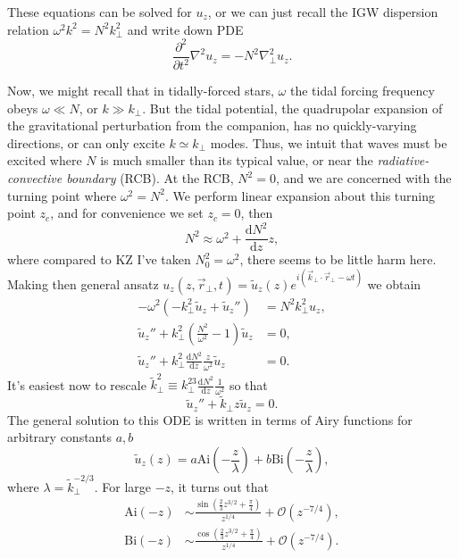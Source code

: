 \documentclass[11pt,
        usenames, %
        dvipsnames %
    ]{article}
\newcommand*{\rd}[2]{\frac{\mathrm{d}#1}{\mathrm{d}#2}}
\newcommand*{\ptd}[2]{\frac{\partial^2 #1}{\partial#2^2}}
\newcommand*{\p}[1]{\left(#1\right)}
\begin{document}
These equations can be solved for $u_z$, or we can just recall the IGW
dispersion relation $\omega^2 k^2 = N^2k_{\perp}^2$ and write down PDE
\begin{equation}
    \ptd{}{t} \nabla^2 u_z = -N^2\nabla_{\perp}^2 u_z.\label{eq:igw_pde}
\end{equation}

Now, we might recall that in tidally-forced stars, $\omega$ the tidal forcing
frequency obeys $\omega \ll N$, or $k \gg k_\perp$. But the tidal potential, the
quadrupolar expansion of the gravitational perturbation from the companion, has
no quickly-varying directions, or can only excite $k \simeq k_\perp$ modes.
Thus, we intuit that waves must be excited where $N$ is much smaller than its
typical value, or near the \emph{radiative-convective boundary} (RCB). At the
RCB, $N^2 = 0$, and we are concerned with the turning point where $\omega^2 =
N^2$. We perform linear expansion about this turning point $z_c$, and for
convenience we set $z_c = 0$, then
\begin{equation}
    N^2 \approx \omega^2 + \rd{N^2}{z}z,
\end{equation}
where compared to KZ I've taken $N_0^2 = \omega^2$, there seems to be little
harm here. Making then general ansatz $u_z(z, \vec{r}_\perp, t) = \tilde{u}_z(z)
e^{i\p{\vec{k}_{\perp} \cdot \vec{r}_{\perp} - \omega t}}$ we obtain
\begin{align}
    -\omega^2 \p{-k_\perp^2 \tilde{u}_z + \tilde{u}_z''}
            &= N^2k_\perp^2 u_z,\\
        \tilde{u}_z'' + k_\perp^2\p{\frac{N^2}{\omega^2} - 1}\tilde{u}_z &= 0
            ,\\
        \tilde{u}_z'' + k_\perp^2\rd{N^2}{z}\frac{z}{\omega^2}\tilde{u}_z &= 0.
\end{align}
It's easiest now to rescale $\tilde{k}_\perp^2 \equiv k_\perp^23
\rd{N^2}{z}\frac{1}{\omega^2}$ so that
\begin{equation}
    \tilde{u}_z'' + \tilde{k}_\perp z\tilde{u}_z = 0.
\end{equation}
The general solution to this ODE is written in terms of Airy functions for
arbitrary constants $a, b$
\begin{equation}
    \tilde{u}_z(z) = a\mathrm{Ai}\p{-\frac{z}{\lambda}}
        + b\mathrm{Bi}\p{-\frac{z}{\lambda}},\label{eq:gen_uz}
\end{equation}
where $\lambda = \tilde{k}_\perp^{-2/3}$. For large $-z$, it turns out that
\begin{align}
    \mathrm{Ai}\p{-z} &\sim \frac{\sin\p{\frac{2}{3}z^{3/2} +
        \frac{\pi}{4}}}{z^{1/4}} + \mathcal{O}\p{z^{-7/4}},\\
    \mathrm{Bi}\p{-z} &\sim \frac{\cos\p{\frac{2}{3}z^{3/2} +
        \frac{\pi}{4}}}{z^{1/4}} + \mathcal{O}\p{z^{-7/4}}.
\end{align}
\end{document}
